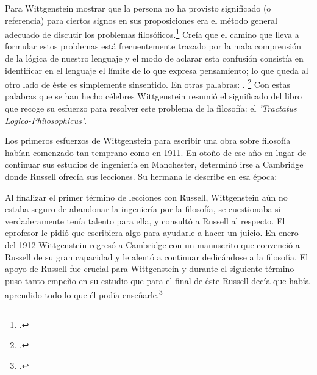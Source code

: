 Para Wittgenstein mostrar que la
persona no ha provisto significado (o referencia) para ciertos signos en sus
proposiciones era el método general adecuado de discutir los problemas
filosóficos.\footcite[cf. p. 151]{IWT} Creía que el camino que lleva a formular
estos problemas está frecuentemente trazado por la mala comprensión de la lógica
de nuestro lenguaje y el modo de aclarar esta confusión consistía en identificar
en el lenguaje el límite de lo que expresa pensamiento; lo que queda al otro
lado de éste es simplemente sinsentido. En otras palabras:
. 
\footcite[prefacio]{tractatus}
Con estas palabras que se han hecho célebres Wittgenstein resumió el significado
del libro que recoge su esfuerzo para resolver este problema de la filosofía: el
\emph{'Tractatus Logico-Philosophicus'}.


Los primeros esfuerzos de Wittgenstein para escribir una obra sobre filosofía
habían comenzado tan temprano como en 1911. En otoño de ese año en lugar de
continuar sus estudios de ingeniería en Manchester, determinó irse a
Cambridge donde Russell ofrecía sus lecciones. Su hermana le describe en esa
época: 

Al finalizar el primer término de lecciones con Russell, Wittgenstein aún no
estaba seguro de abandonar la ingeniería por la filosofía, se cuestionaba si
verdaderamente tenía talento para ella, y consultó a Russell al respecto. El
cprofesor le pidió que escribiera algo para ayudarle a hacer un juicio. En enero
del 1912 Wittgenstein regresó a Cambridge con un manuscrito que convenció a
Russell de su gran capacidad y le alentó a continuar dedicándose a la filosofía.
El apoyo de Russell fue crucial para Wittgenstein y durante el siguiente término
puso tanto empeño en su estudio que para el final de éste Russell decía que
había aprendido todo lo que él podía enseñarle.\footcite[cap. 3 loc 865]{monk}

